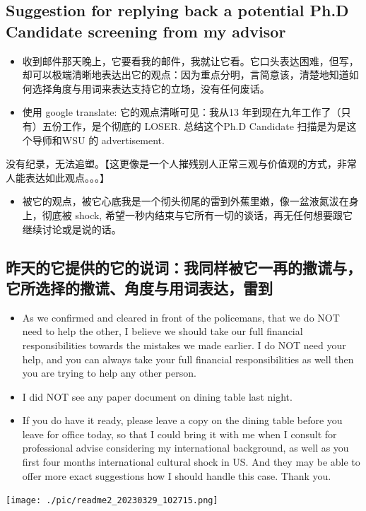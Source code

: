 \documentclass[9pt, b5paper]{article}
\begin{document}
\subsection{Suggestion for replying back a potential Ph.D Candidate screening from my advisor}
\label{sec-5-2}
\begin{itemize}
\item 收到邮件那天晚上，它要看我的邮件，我就让它看。它口头表达困难，但写，却可以极端清晰地表达出它的观点：因为重点分明，言简意该，清楚地知道如何选择角度与用词来表达支持它的立场，没有任何废话。
\item 使用 google translate: 它的观点清晰可见：我从13 年到现在九年工作了（只有）五份工作，是个彻底的 LOSER. 总结这个Ph.D Candidate 扫描是为是这个导师和WSU 的 advertisement.
\end{itemize}
没有纪录，无法追塑。【这更像是一个人摧残别人正常三观与价值观的方式，非常人能表达如此观点。。。】
\begin{itemize}
\item 被它的观点，被它心底我是一个彻头彻尾的雷到外蕉里嫩，像一盆液氮沷在身上，彻底被 shock, 希望一秒内结束与它所有一切的谈话，再无任何想要跟它继续讨论或是说的话。
\end{itemize}
\subsection{昨天的它提供的它的说词：我同样被它一再的撒谎与，它所选择的撒谎、角度与用词表达，雷到}
\label{sec-5-3}
\begin{itemize}
\item As we confirmed and cleared in front of the policemans, that we do NOT need to help the other, I believe we should take our full financial responsibilities towards the mistakes we made earlier. I do NOT need your help, and you can always take your full financial responsibilities as well then you are trying to help any other person.
\item I did NOT see any paper document on dining table last night.
\item If you do have it ready, please leave a copy on the dining table before you leave for office today, so that I could bring it with me when I consult for professional advise considering my international background, as well as you first four months international cultural shock in US. And they may be able to offer more exact suggestions how I should handle this case. Thank you.
\end{itemize}

\texttt{[image: ./pic/readme2\_20230329\_102715.png]}
\end{document}
